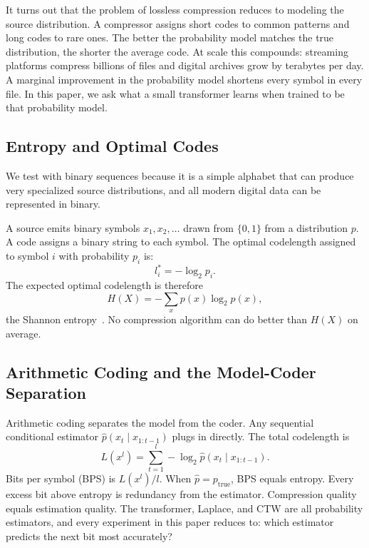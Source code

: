 \documentclass[onecolumn,english,12pt]{IEEEtran}
\begin{document}
It turns out that the problem of lossless compression reduces to modeling the source distribution. A
compressor assigns short codes to common patterns and long codes to rare
ones. The better the probability model matches the true distribution,
the shorter the average code. At scale this compounds: streaming
platforms compress billions of files and digital archives grow by
terabytes per day. A marginal improvement in the probability model
shortens every symbol in every file. In this paper, we ask what a small transformer learns when trained to be that probability model.

\subsection{Entropy and Optimal Codes}
\label{sec:entropy}

We test with binary sequences because it is a simple alphabet that can produce very specialized source distributions, and all modern digital data can be represented in binary.

A source emits binary symbols
$x_1, x_2, \ldots$ drawn from $\{0, 1\}$ from a distribution $p$. A code assigns
a binary string to each symbol. The optimal codelength assigned to symbol $i$ with probability $p_i$ is:
\begin{equation}
  l_i^* = -\log_2 p_i.
  \label{eq:optlen}
\end{equation}
The expected optimal codelength is therefore
\begin{equation}
  H(X) = -\sum_x p(x)\log_2 p(x),
  \label{eq:entropy}
\end{equation}
the Shannon entropy~\cite{CoverThomas}. No compression algorithm can do better than $H(X)$ on average.

\subsection{Arithmetic Coding and the Model-Coder Separation}
\label{sec:arith}

Arithmetic coding separates the model from the coder. Any sequential conditional estimator $\hat{p}(x_t \mid x_{1:t-1})$ plugs in directly. The total codelength is
\begin{equation}
  L(x^l) = \sum_{t=1}^{l} -\log_2 \hat{p}(x_t \mid x_{1:t-1}).
  \label{eq:codelength}
\end{equation}
Bits per symbol (BPS) is $L(x^l)/l$. When $\hat{p} = p_{\mathrm{true}}$, BPS equals entropy. Every excess bit above entropy is redundancy from the estimator. Compression quality equals estimation quality. The transformer, Laplace, and CTW are all probability estimators, and every experiment in this paper reduces to: which estimator predicts the next bit most accurately?
\end{document}
